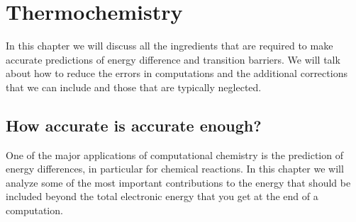 \documentclass[../Main/notes.tex]{subfiles}
\begin{document}
\chapter{Thermochemistry}

In this chapter we will discuss all the ingredients that are required to make accurate predictions of energy difference and transition barriers.
We will talk about how to reduce the errors in computations and the additional corrections that we can include and those that are typically neglected.

\section{How accurate is accurate enough?}
One of the major applications of computational chemistry is the prediction of energy differences, in particular for chemical reactions.
In this chapter we will analyze some of the most important contributions to the energy that should be included beyond the total electronic energy that you get at the end of a computation.
\end{document}
